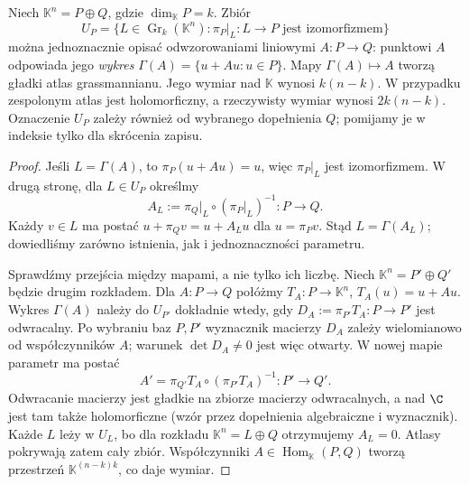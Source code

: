 \begin{twierdzenie}
\label{thm:lin29-grass-atlas}
Niech $\mathbb K^n=P\oplus Q$, gdzie $\dim_{\mathbb K}P=k$.
Zbiór
\[
 U_P=\{L\in\operatorname{Gr}_k(\mathbb K^n):
           \pi_P|_L:L\longrightarrow P\text{ jest izomorfizmem}\}
\]
można jednoznacznie opisać odwzorowaniami liniowymi
$A:P\to Q$: punktowi $A$ odpowiada jego
\emph{wykres} $\Gamma(A)=\{u+Au:u\in P\}$.
Mapy $\Gamma(A)\mapsto A$ tworzą gładki atlas
grassmannianu. Jego wymiar nad $\mathbb K$ wynosi
$k(n-k)$. W przypadku zespolonym atlas jest holomorficzny,
a rzeczywisty wymiar wynosi $2k(n-k)$.
Oznaczenie $U_P$ zależy również od wybranego dopełnienia $Q$;
pomijamy je w indeksie tylko dla skrócenia zapisu.
\end{twierdzenie}
\begin{proof}
Jeśli $L=\Gamma(A)$, to $\pi_P(u+Au)=u$, więc
$\pi_P|_L$ jest izomorfizmem. W drugą stronę, dla
$L\in U_P$ określmy
\[
 A_L:=\pi_Q|_L\circ(\pi_P|_L)^{-1}:P\longrightarrow Q.
\]
Każdy $v\in L$ ma postać $u+\pi_Qv=u+A_Lu$
dla $u=\pi_Pv$. Stąd $L=\Gamma(A_L)$; dowiedliśmy
zarówno istnienia, jak i jednoznaczności parametru.

Sprawdźmy przejścia między mapami, a nie tylko ich
liczbę. Niech $\mathbb K^n=P'\oplus Q'$ będzie drugim
rozkładem. Dla $A:P\to Q$ połóżmy
$T_A:P\to\mathbb K^n$, $T_A(u)=u+Au$.
Wykres $\Gamma(A)$ należy do $U_{P'}$ dokładnie wtedy,
gdy $D_A:=\pi_{P'}T_A:P\to P'$ jest odwracalny.
Po wybraniu baz $P,P'$ wyznacznik macierzy $D_A$ zależy
wielomianowo od współczynników $A$;
warunek $\det D_A\ne0$ jest więc otwarty. W nowej mapie
parametr ma postać
\begin{equation}\label{eq:lin29-grass-przejscie}
 A'=\pi_{Q'}T_A\circ(\pi_{P'}T_A)^{-1}:P'\longrightarrow Q'.
\end{equation}
Odwracanie macierzy jest gładkie na zbiorze macierzy
odwracalnych, a nad $\C$ jest tam także holomorficzne
(wzór przez dopełnienia algebraiczne i wyznacznik).
Każde $L$ leży w $U_L$, bo dla rozkładu
$\mathbb K^n=L\oplus Q$ otrzymujemy $A_L=0$.
Atlasy pokrywają zatem cały zbiór. Współczynniki
$A\in\operatorname{Hom}_{\mathbb K}(P,Q)$ tworzą
przestrzeń $\mathbb K^{(n-k)k}$, co daje wymiar.


\end{proof}
